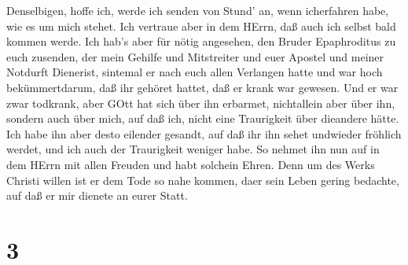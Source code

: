  Denselbigen, hoffe ich, werde ich senden von Stund' an,
wenn icherfahren habe, wie es um mich stehet.  Ich vertraue
aber in dem HErrn, daß auch ich selbst bald kommen werde. 
Ich hab's aber für nötig angesehen, den Bruder Epaphroditus zu euch
zusenden, der mein Gehilfe und Mitstreiter und euer Apostel und meiner
Notdurft Dienerist,  sintemal er nach euch allen Verlangen
hatte und war hoch bekümmertdarum, daß ihr gehöret hattet, daß er krank
war gewesen.  Und er war zwar todkrank, aber GOtt hat sich
über ihn erbarmet, nichtallein aber über ihn, sondern auch über mich,
auf daß ich, nicht eine Traurigkeit über dieandere hätte. 
Ich habe ihn aber desto eilender gesandt, auf daß ihr ihn sehet
undwieder fröhlich werdet, und ich auch der Traurigkeit weniger habe.
 So nehmet ihn nun auf in dem HErrn mit allen Freuden und
habt solchein Ehren.  Denn um des Werks Christi willen ist
er dem Tode so nahe kommen, daer sein Leben gering bedachte, auf daß er
mir dienete an eurer Statt.

\hypertarget{section-2}{%
\section{3}\label{section-2}}

